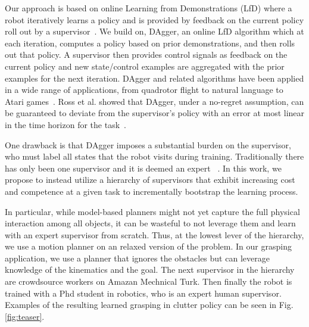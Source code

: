 \documentclass[10pt, conference]{ieeeconf}      %
\begin{document}
Our approach is based on online Learning from Demonstrations (LfD) where a robot iteratively learns a policy and is
provided by feedback on the current policy roll out by a supervisor~\cite{grollman2007dogged,ross2010efficient,ross2010reduction}. 
We build on, DAgger, an online LfD algorithm which at each iteration, computes a policy based on prior demonstrations,
and then rolls out that policy. A supervisor then provides control signals as feedback on the current policy
and new state/control examples are aggregated with the prior examples for the next iteration. DAgger and related algorithms have been applied in a wide range of applications, from quadrotor flight to natural language to Atari games~\cite{NIPS2014_5421,duvallet2013imitation,ross2013learning}. 
Ross et al. showed that DAgger, under a no-regret assumption, can be guaranteed to deviate from the supervisor's policy with an error
at most linear in the time horizon for the task~\cite{ross2010reduction}.

One drawback is that DAgger imposes a substantial burden on the supervisor, who must label all states that the robot
visits during training.  Traditionally there has only been one supervisor and it is deemed an expert
~\cite{ross2010efficient,ross2010reduction,ross2013learning,duvallet2013imitation}. In this work, we propose to instead
utilize a hierarchy of supervisors that exhibit increasing cost and competence at a given task to incrementally
bootstrap the learning process. 

In particular, while model-based planners might not yet capture the full physical interaction among all objects, it can be wasteful to not leverage them and learn with an expert supervisor from scratch. Thus, at the lowest lever of the hierarchy, we use a motion planner on an relaxed version of the problem. In our grasping application, we use a planner that ignores the obstacles but can leverage knowledge of the kinematics and the goal.
The next supervisor in the hierarchy are crowdsource workers on Amazan Mechnical Turk. Then finally the robot is trained with a Phd student in robotics, who is an expert human supervisor. Examples of the resulting learned grasping in clutter policy can be seen in Fig. \ref{fig:teaser}. 

\end{document}
